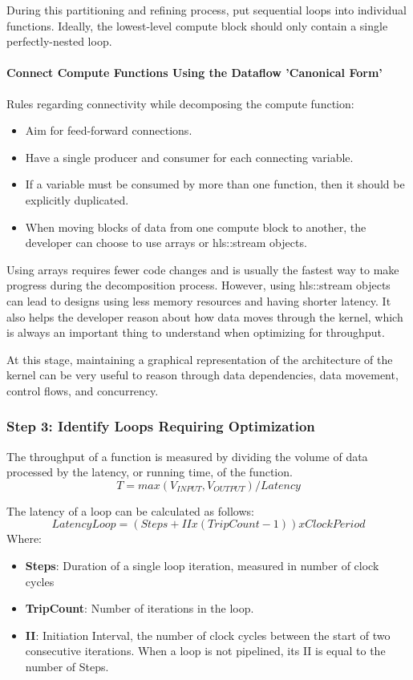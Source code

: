 \par During this partitioning and refining process, put sequential loops into individual functions. Ideally, the lowest-level compute block should only contain a single perfectly-nested loop. 

\paragraph{Connect Compute Functions Using the Dataflow 'Canonical Form'}
Rules regarding connectivity while decomposing the compute function:
\begin{itemize}
    \item Aim for feed-forward connections. 
    \item Have a single producer and consumer for each connecting variable. 
    \item If a variable must be consumed by more than one function, then it should be explicitly duplicated.
    \item When moving blocks of data from one compute block to another, the developer can choose to use arrays or hls::stream objects.
\end{itemize}

Using arrays requires fewer code changes and is usually the fastest way to make progress during the decomposition process. However, using hls::stream objects can lead to designs using less memory resources and having shorter latency. It also helps the developer reason about how data
moves through the kernel, which is always an important thing to understand when optimizing for throughput.

\par At this stage, maintaining a graphical representation of the architecture of the kernel can be very useful to reason through data dependencies, data movement, control flows, and concurrency.

\subsubsection{Step 3: Identify Loops Requiring Optimization}
The throughput of a function is measured by dividing the volume of data processed by the latency, or running time, of the function.
\[ T = max(V_{INPUT}, V_{OUTPUT}) / Latency \]

The latency of a loop can be calculated as follows:
\[LatencyLoop = (Steps + II x (TripCount - 1)) x ClockPeriod \] 
Where:
\begin{itemize}
    \item \textbf{Steps}: Duration of a single loop iteration, measured in number of clock cycles
    \item \textbf{TripCount}: Number of iterations in the loop.
    \item \textbf{II}: Initiation Interval, the number of clock cycles between the start of two consecutive iterations. When a loop is not pipelined, its II is equal to the number of Steps.
\end{itemize}


